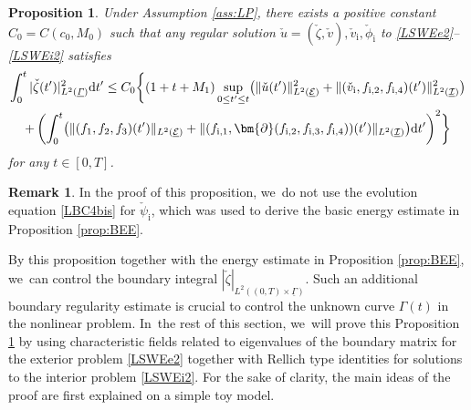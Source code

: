 \documentclass[10pt]{amsart}
\newcommand{\cI}{{\mathcal I}}
\newcommand{\cE}{{\mathcal E}}
\newcommand{\ul}[1]{\underline{#1}}
\newcommand{\itGamma}{\mathit{\Gamma}}
\newtheorem{proposition}[theorem]{Proposition}
\theoremstyle{definition}
\newtheorem{remark}[theorem]{Remark}
\begin{document}
\begin{proposition}\label{prop:ABR}
Under Assumption \ref{ass:LP}, there exists a positive constant $C_0=C(c_0,M_0)$ such that any regular solution
$\check{u}=(\check{\zeta},\check{v}), \check{v}_\mathrm{i}, \check{\phi}_\mathrm{i}$ to \eqref{LSWEe2}--\eqref{LSWEi2} satisfies
\begin{multline*}
\int_0^t|\check{\zeta}(t') |_{L^2(\ul{\itGamma})}^2\mathrm{d}t'
\leq C_0 \biggl\{ (1+t+M_1)\sup_{0\leq t'\leq t}\bigl(\|\check{u}(t')\|_{L^2(\ul{\cE})}^2
+ \|(\check{v}_\mathrm{i},f_{{\rm i},2},f_{{\rm i},4})(t')\|_{L^2(\ul{\cI})}^2 \bigr) \\
+ \left(\int_0^t \bigl(\|(f_1,f_2,f_3)(t')\|_{L^2(\ul{\cE})}
+ \|(f_{{\rm i},1},\bm{\partial}(f_{{\rm i},2},f_{{\rm i},3},f_{{\rm i},4}))(t')\|_{L^2(\ul{\cI})} \bigr){\rm d}t' \right)^2 \biggr\}
\end{multline*}
for any $t\in[0,T]$.
\end{proposition}

\begin{remark}
In the proof of this proposition, we~do not use the evolution equation \eqref{LBC4bis} for $\check{\psi}_\mathrm{i}$,
which was used to derive the basic energy estimate in Proposition \ref{prop:BEE}.
\end{remark}

By this proposition together with the energy estimate in Proposition \ref{prop:BEE}, we~can control the boundary integral
$|\check{\zeta}|_{L^2((0,T)\times\ul{\itGamma})}$.
Such an additional boundary regularity estimate is crucial to control the unknown curve $\itGamma(t)$ in the nonlinear problem. In~the rest of this section, we~will prove this Proposition \ref{prop:ABR} by using characteristic fields related to eigenvalues of the boundary matrix for the exterior problem \eqref{LSWEe2}
together with Rellich type identities for solutions to the interior problem \eqref{LSWEi2}.
For the sake of clarity, the main ideas of the proof are first explained on a simple toy model.
\end{document}
